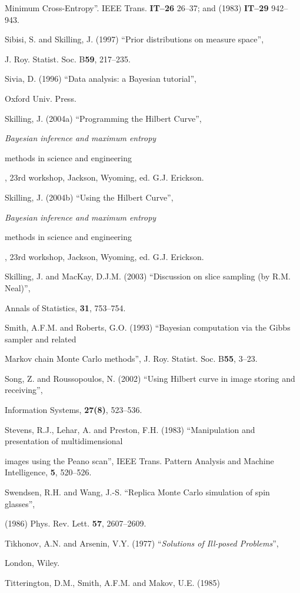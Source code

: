  Minimum Cross-Entropy''. IEEE Trans. {\bf IT--26} 26--37; and (1983) {\bf IT--29} 942--943.

\noindent Sibisi, S. and Skilling, J. (1997) ``Prior distributions on measure space'',

 J. Roy. Statist. Soc. B{\bf 59}, 217--235.

\noindent Sivia, D. (1996) ``Data analysis: a Bayesian tutorial'',

 Oxford Univ. Press.

\noindent Skilling, J. (2004a) ``Programming the Hilbert Curve'', {\it Bayesian inference and maximum entropy

 methods in science and engineering}, 23rd workshop, Jackson, Wyoming, ed. G.J. Erickson.

\noindent Skilling, J. (2004b) ``Using the Hilbert Curve'', {\it Bayesian inference and maximum entropy

 methods in science and engineering}, 23rd workshop, Jackson, Wyoming, ed. G.J. Erickson.

\noindent Skilling, J. and MacKay, D.J.M. (2003) ``Discussion on slice sampling (by R.M. Neal)'',

 Annals of Statistics, {\bf 31}, 753--754.

\noindent Smith, A.F.M. and Roberts, G.O. (1993) ``Bayesian computation via the Gibbs sampler and related

 Markov chain Monte Carlo methods'', J. Roy. Statist. Soc. B{\bf 55}, 3--23.

\noindent Song, Z. and Roussopoulos, N. (2002) ``Using Hilbert curve in image storing and receiving'',

 Information Systems, {\bf 27(8)}, 523--536.

\noindent Stevens, R.J., Lehar, A. and Preston, F.H. (1983) ``Manipulation and presentation of multidimensional

 images using the Peano scan'', IEEE Trans. Pattern Analysis and Machine Intelligence, {\bf 5}, 520--526.

\noindent Swendsen, R.H. and Wang, J.-S. ``Replica Monte Carlo simulation of spin glasses'',

 (1986) Phys. Rev. Lett. {\bf 57}, 2607--2609.

\noindent Tikhonov, A.N. and Arsenin, V.Y. (1977) ``{\it Solutions of Ill-posed Problems}'',

  London, Wiley.

\noindent Titterington, D.M., Smith, A.F.M. and Makov, U.E. (1985)

